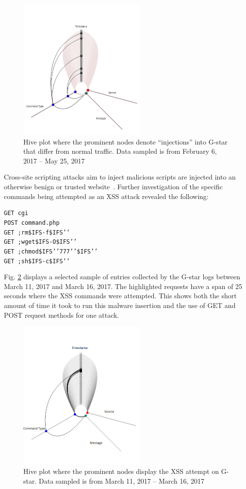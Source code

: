 \begin{figure}[t]
   \centering
   \includegraphics[width=2.5in]{images/uniqHive.png} 
   \caption{Hive plot where the prominent nodes denote ``injections'' into G-star that differ from normal traffic. Data sampled is from February 6, 2017 -- May 25, 2017}
   \label{fig:uniqHive}
\end{figure}

Cross-site scripting attacks aim to inject malicious scripts are injected into an otherwise benign or trusted website~\cite{XSS-def}. 
Further investigation of the specific commands being attempted as an XSS attack revealed the following:

\noindent \texttt{GET cgi\\
POST command.php\\
GET ;rm\$IFS-f\$IFS’'\\
GET ;wget\$IFS-O\$IFS’'\\
GET ;chmod\$IFS'’777’'\$IFS’'\\
GET ;sh\$IFS-c\$IFS‘'}

\noindent Fig. \ref{fig:XSS} displays a selected sample of entries collected by the G-star logs between March 11, 2017 and March 16, 2017. 
The highlighted requests have a span of 25 seconds where the XSS commands were attempted.
This shows both the short amount of time it took to run this malware insertion and the use of GET and POST request methods for one attack.
\begin{figure}[t]
   \centering
   \includegraphics[width=2.5in]{images/XSS.png}  
   \caption{Hive plot where the prominent nodes display the XSS attempt on G-star. Data sampled is from March 11, 2017 -- March 16, 2017}
   \label{fig:XSS}
\end{figure}

